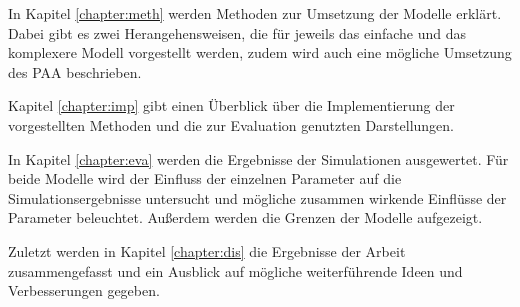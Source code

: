 In Kapitel \ref{chapter:meth} werden Methoden zur Umsetzung der Modelle erklärt. Dabei gibt es zwei Herangehensweisen, die für jeweils das einfache und das komplexere Modell vorgestellt werden, zudem wird auch eine mögliche Umsetzung des PAA beschrieben.

Kapitel \ref{chapter:imp} gibt einen Überblick über die Implementierung der vorgestellten Methoden und die zur Evaluation genutzten Darstellungen.

In Kapitel \ref{chapter:eva} werden die Ergebnisse der Simulationen ausgewertet. Für beide Modelle wird der Einfluss der einzelnen Parameter auf die Simulationsergebnisse untersucht und mögliche zusammen wirkende Einflüsse der Parameter beleuchtet. Außerdem werden die Grenzen der Modelle aufgezeigt.

Zuletzt werden in Kapitel \ref{chapter:dis} die Ergebnisse der Arbeit zusammengefasst und ein Ausblick auf mögliche weiterführende Ideen und Verbesserungen gegeben.